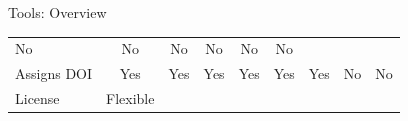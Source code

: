\documentclass[ignorenonframetext,]{beamer}
\begin{document}
\begin{frame}{Tools: Overview}
\begin{longtable}[]{@{}lcccccccc@{}}
\begin{minipage}[t]{0.05\columnwidth}
No\strut
\end{minipage} & \begin{minipage}[t]{0.07\columnwidth}\centering
No\strut
\end{minipage} & \begin{minipage}[t]{0.04\columnwidth}\centering
No\strut
\end{minipage} & \begin{minipage}[t]{0.06\columnwidth}\centering
No\strut
\end{minipage} & \begin{minipage}[t]{0.15\columnwidth}\centering
No\strut
\end{minipage} & \begin{minipage}[t]{0.18\columnwidth}\centering
No\strut
\end{minipage}\tabularnewline
\begin{minipage}[t]{0.12\columnwidth}\raggedright
Assigns DOI\strut
\end{minipage} & \begin{minipage}[t]{0.05\columnwidth}\centering
Yes\strut
\end{minipage} & \begin{minipage}[t]{0.05\columnwidth}\centering
Yes\strut
\end{minipage} & \begin{minipage}[t]{0.05\columnwidth}\centering
Yes\strut
\end{minipage} & \begin{minipage}[t]{0.07\columnwidth}\centering
Yes\strut
\end{minipage} & \begin{minipage}[t]{0.04\columnwidth}\centering
Yes\strut
\end{minipage} & \begin{minipage}[t]{0.06\columnwidth}\centering
Yes\strut
\end{minipage} & \begin{minipage}[t]{0.15\columnwidth}\centering
No\strut
\end{minipage} & \begin{minipage}[t]{0.18\columnwidth}\centering
No\strut
\end{minipage}\tabularnewline
\begin{minipage}[t]{0.12\columnwidth}\raggedright
License\strut
\end{minipage} & \begin{minipage}[t]{0.05\columnwidth}\centering
Flexible\strut
\end{minipage} & \begin{minipage}[t]{0.05\columnwidth}\centering

\end{minipage}
\end{longtable}
\end{frame}
\end{document}
